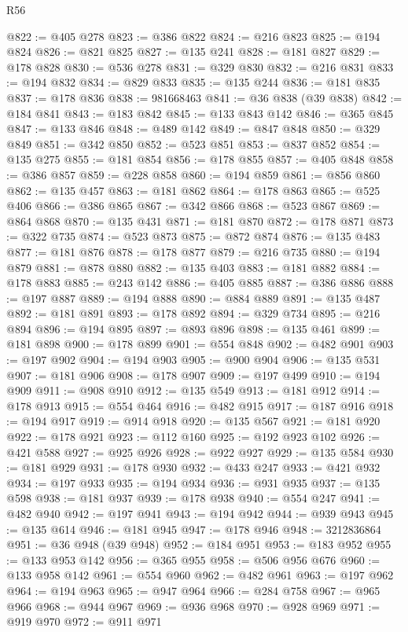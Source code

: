 \begin{lexlean}{R56}
\begin{coremodule}
@822 := @405 @278
@823 := @386 @822
@824 := @216 @823
@825 := @194 @824
@826 := @821 @825
@827 := @135 @241
@828 := @181 @827
@829 := @178 @828
@830 := @536 @278
@831 := @329 @830
@832 := @216 @831
@833 := @194 @832
@834 := @829 @833
@835 := @135 @244
@836 := @181 @835
@837 := @178 @836
@838 := 981668463
@841 := @36 @838 (@39 @838)
@842 := @184 @841
@843 := @183 @842
@845 := @133 @843 @142
@846 := @365 @845
@847 := @133 @846
@848 := @489 @142
@849 := @847 @848
@850 := @329 @849
@851 := @342 @850
@852 := @523 @851
@853 := @837 @852
@854 := @135 @275
@855 := @181 @854
@856 := @178 @855
@857 := @405 @848
@858 := @386 @857
@859 := @228 @858
@860 := @194 @859
@861 := @856 @860
@862 := @135 @457
@863 := @181 @862
@864 := @178 @863
@865 := @525 @406
@866 := @386 @865
@867 := @342 @866
@868 := @523 @867
@869 := @864 @868
@870 := @135 @431
@871 := @181 @870
@872 := @178 @871
@873 := @322 @735
@874 := @523 @873
@875 := @872 @874
@876 := @135 @483
@877 := @181 @876
@878 := @178 @877
@879 := @216 @735
@880 := @194 @879
@881 := @878 @880
@882 := @135 @403
@883 := @181 @882
@884 := @178 @883
@885 := @243 @142
@886 := @405 @885
@887 := @386 @886
@888 := @197 @887
@889 := @194 @888
@890 := @884 @889
@891 := @135 @487
@892 := @181 @891
@893 := @178 @892
@894 := @329 @734
@895 := @216 @894
@896 := @194 @895
@897 := @893 @896
@898 := @135 @461
@899 := @181 @898
@900 := @178 @899
@901 := @554 @848
@902 := @482 @901
@903 := @197 @902
@904 := @194 @903
@905 := @900 @904
@906 := @135 @531
@907 := @181 @906
@908 := @178 @907
@909 := @197 @499
@910 := @194 @909
@911 := @908 @910
@912 := @135 @549
@913 := @181 @912
@914 := @178 @913
@915 := @554 @464
@916 := @482 @915
@917 := @187 @916
@918 := @194 @917
@919 := @914 @918
@920 := @135 @567
@921 := @181 @920
@922 := @178 @921
@923 := @112 @160
@925 := @192 @923 @102
@926 := @421 @588
@927 := @925 @926
@928 := @922 @927
@929 := @135 @584
@930 := @181 @929
@931 := @178 @930
@932 := @433 @247
@933 := @421 @932
@934 := @197 @933
@935 := @194 @934
@936 := @931 @935
@937 := @135 @598
@938 := @181 @937
@939 := @178 @938
@940 := @554 @247
@941 := @482 @940
@942 := @197 @941
@943 := @194 @942
@944 := @939 @943
@945 := @135 @614
@946 := @181 @945
@947 := @178 @946
@948 := 3212836864
@951 := @36 @948 (@39 @948)
@952 := @184 @951
@953 := @183 @952
@955 := @133 @953 @142
@956 := @365 @955
@958 := @506 @956 @676
@960 := @133 @958 @142
@961 := @554 @960
@962 := @482 @961
@963 := @197 @962
@964 := @194 @963
@965 := @947 @964
@966 := @284 @758
@967 := @965 @966
@968 := @944 @967
@969 := @936 @968
@970 := @928 @969
@971 := @919 @970
@972 := @911 @971

\end{coremodule}
\end{lexlean}
